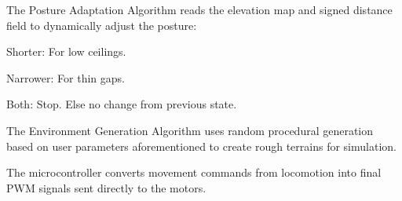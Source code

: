 The Posture Adaptation Algorithm reads the elevation map and signed distance field to dynamically adjust the posture:

     Shorter: For low ceilings.
     
     Narrower: For thin gaps.

    Both: Stop.
Else no change from previous state.

The Environment Generation Algorithm uses random procedural generation based on user parameters aforementioned to create rough terrains for simulation.

The microcontroller converts movement commands from locomotion into final PWM signals sent directly to the motors.

